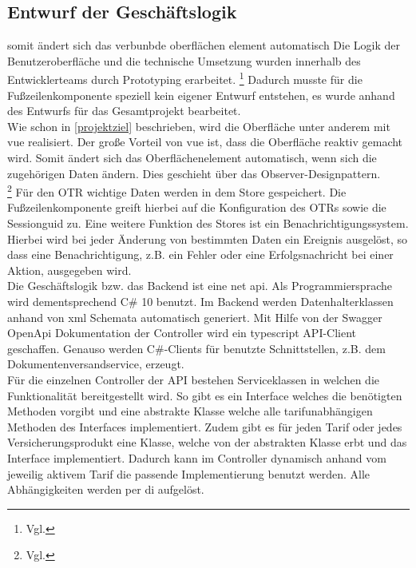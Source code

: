 \subsection{Entwurf der Geschäftslogik} somit ändert sich das verbunbde oberflächen element automatisch 
\label{geschaeftslogik}
Die Logik der Benutzeroberfläche und die technische Umsetzung wurden innerhalb des Entwicklerteams durch Prototyping erarbeitet. \footnote{Vgl.\cite{Prototyping2022}}
Dadurch musste für die Fußzeilenkomponente speziell kein eigener Entwurf entstehen, es wurde anhand des Entwurfs für das Gesamtprojekt bearbeitet.\\
Wie schon in \ref{projektziel}  beschrieben, wird die Oberfläche unter anderem mit \gls{vue} realisiert. Der große Vorteil von \gls{vue} ist, dass die Oberfläche reaktiv gemacht wird. Somit ändert sich das Oberflächenelement automatisch, wenn sich die zugehörigen Daten ändern. Dies geschieht über das Observer-Designpattern.\\ \footnote{Vgl.\cite{ReactivityinDepth2022}}
Für den \ac{OTR} wichtige Daten werden in dem Store gespeichert. Die Fußzeilenkomponente greift hierbei auf die Konfiguration des \ac{OTR}s sowie die Sessionguid zu.
Eine weitere Funktion des Stores ist ein Benachrichtigungssystem. Hierbei wird bei jeder Änderung von bestimmten Daten ein Ereignis ausgelöst, so dass eine Benachrichtigung, z.B. ein Fehler oder eine Erfolgsnachricht bei einer Aktion, ausgegeben wird.\\

Die Geschäftslogik bzw. das Backend ist eine \gls{net} \gls{api}. Als Programmiersprache wird dementsprechend C\# 10 benutzt.
Im Backend werden Datenhalterklassen anhand von \gls{xml} Schemata automatisch generiert. Mit Hilfe von der Swagger OpenApi Dokumentation der Controller wird ein \gls{typescript} API-Client geschaffen. Genauso werden C\#-Clients für benutzte Schnittstellen, z.B. dem Dokumentenversandservice, erzeugt.\\
Für die einzelnen Controller der API bestehen Serviceklassen in welchen die Funktionalität bereitgestellt wird. So gibt es ein Interface welches die benötigten Methoden vorgibt und eine abstrakte Klasse welche alle tarifunabhängigen Methoden des Interfaces implementiert. Zudem gibt es für jeden Tarif oder jedes Versicherungsprodukt eine Klasse, welche von der abstrakten Klasse erbt und das Interface implementiert. Dadurch kann im Controller dynamisch anhand vom jeweilig aktivem Tarif die passende Implementierung benutzt werden. %
Alle Abhängigkeiten werden per \gls{di} aufgelöst.
